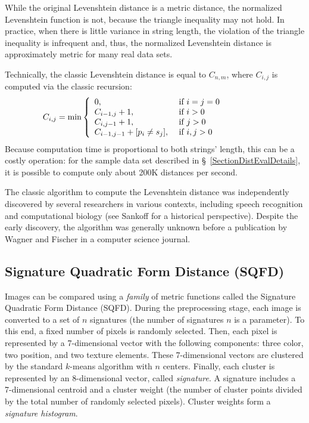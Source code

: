 \documentclass[runningheads,a4paper]{llncs}
\begin{document}
{While the original Levenshtein distance is a metric distance, the normalized Levenshtein function is not,
because the triangle inequality may not hold.
In practice, when there is little variance in string length, 
the violation of the triangle inequality is infrequent and, thus, the normalized Levenshtein distance
is approximately metric for many real data sets.


Technically, the classic Levenshtein distance is equal to $C_{n,m}$, where $C_{i,j}$ is computed via the classic recursion:
\begin{equation} \label{EqLeven}
\hspace{-5em}C_{i,j} =\min \left\{\begin{array}{ll} 
0 ,                 & \mbox{ if } i =  j = 0 \\
{C_{i - 1, j} +1,}  & \mbox{ if } i> 0 \\
{C_{i,j-1} +1 ,  }  & \mbox{ if } j > 0 \\
{C_{i - 1, j - 1} + \left[p_{i} \neq s_{j} \right]} ,   & \mbox{ if } i,j > 0  \\
\end{array}
\right.
\end{equation}
Because computation time is proportional to both strings' length,
this can be a costly operation: for the sample data set described in \S~\ref{SectionDistEvalDetails}, 
it is possible to compute only about 200K distances per second.

The classic algorithm to compute the Levenshtein distance was independently discovered by several researchers in
various contexts, including speech recognition \cite{Vintsyuk:1968,Velichko_and_Zagoruyko:1970,Sakoe_and_Chiba:1971} and computational
biology \cite{Needleman_and_Wunsch:1970}
 (see Sankoff \cite{Sankoff:2000} for a historical perspective).
Despite the early discovery, the algorithm was generally unknown
before a publication by Wagner and Fischer \cite{Wagner_and_Fischer:1974} in a computer science journal.

\subsection{Signature Quadratic Form Distance (SQFD)}\label{SectionSQFD}
Images can be compared using a \emph{family} of metric functions called  the
Signature Quadratic Form Distance (SQFD).
During the preprocessing stage, each image is converted to a set of $n$ signatures (the number of signatures $n$ is a parameter).
To this end, a fixed number of pixels is randomly selected.
Then, each pixel is represented by a 7-dimensional vector with the following components:
three color, two position, and two texture elements.
These 7-dimensional vectors are clustered by the standard $k$-means algorithm with $n$ centers.
Finally, each cluster is represented by an 8-dimensional vector, called \emph{signature}.
A signature includes a 7-dimensional centroid and a cluster weight (the number
of cluster points divided by the total number of randomly selected pixels).
Cluster weights form a \emph{signature histogram}.
 
}
\end{document}
